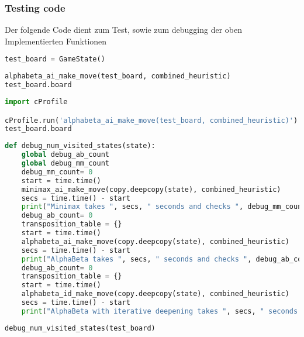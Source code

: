 \hypertarget{testing-code}{%
\subsubsection{Testing code}\label{testing-code}}

Der folgende Code dient zum Test, sowie zum debugging der oben
Implementierten Funktionen

\begin{lstlisting}[language=Python]
test_board = GameState()
\end{lstlisting}

\begin{lstlisting}[language=Python]
alphabeta_ai_make_move(test_board, combined_heuristic)
test_board.board
\end{lstlisting}

\begin{lstlisting}[language=Python]
import cProfile

cProfile.run('alphabeta_ai_make_move(test_board, combined_heuristic)')
test_board.board
\end{lstlisting}

\begin{lstlisting}[language=Python]
def debug_num_visited_states(state):
    global debug_ab_count
    global debug_mm_count
    debug_mm_count= 0
    start = time.time()
    minimax_ai_make_move(copy.deepcopy(state), combined_heuristic)
    secs = time.time() - start
    print("Minimax takes ", secs, " seconds and checks ", debug_mm_count, "substates")
    debug_ab_count= 0
    transposition_table = {}
    start = time.time()
    alphabeta_ai_make_move(copy.deepcopy(state), combined_heuristic)
    secs = time.time() - start
    print("AlphaBeta takes ", secs, " seconds and checks ", debug_ab_count, "substates")
    debug_ab_count= 0
    transposition_table = {}
    start = time.time()
    alphabeta_id_make_move(copy.deepcopy(state), combined_heuristic)
    secs = time.time() - start
    print("AlphaBeta with iterative deepening takes ", secs, " seconds and checks ", debug_ab_count, "substates")
\end{lstlisting}

\begin{lstlisting}[language=Python]
debug_num_visited_states(test_board)
\end{lstlisting}

